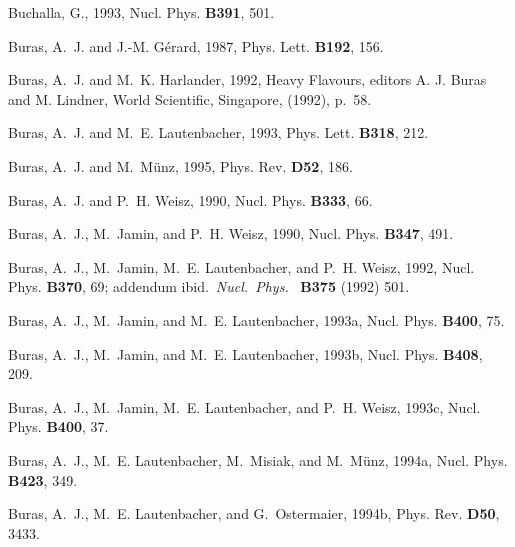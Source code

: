 \begin{thebibliography}{\protect{}1991}
Buchalla, G., 1993,
\newblock Nucl. Phys. {\bf B391}, 501.

Buras, A.~J. and J.-M. G\'{e}rard, 1987,
\newblock Phys. Lett. {\bf B192}, 156.

Buras, A.~J. and M.~K. Harlander, 1992,
 Heavy Flavours, {\rm editors A. J. Buras and M. Lindner,
  World Scientific, Singapore, (1992), p.\ 58}.

Buras, A.~J. and M.~E. Lautenbacher, 1993,
\newblock Phys. Lett. {\bf B318}, 212.

Buras, A.~J. and M.~M{\"u}nz, 1995,
\newblock Phys. Rev. {\bf D52}, 186.

Buras, A.~J. and P.~H. Weisz, 1990,
\newblock Nucl. Phys. {\bf B333}, 66.

Buras, A.~J., M.~Jamin, and P.~H. Weisz, 1990,
\newblock Nucl. Phys. {\bf B347}, 491.

Buras, A.~J., M.~Jamin, M.~E. Lautenbacher, and P.~H. Weisz, 1992,
\newblock Nucl. Phys. {\bf B370}, 69; addendum ibid.~{\em Nucl.~Phys.}~{\bf
  B375} (1992) 501.

Buras, A.~J., M.~Jamin, and M.~E. Lautenbacher, 1993a,
\newblock Nucl. Phys. {\bf B400}, 75.

Buras, A.~J., M.~Jamin, and M.~E. Lautenbacher, 1993b,
\newblock Nucl. Phys. {\bf B408}, 209.

Buras, A.~J., M.~Jamin, M.~E. Lautenbacher, and P.~H. Weisz, 1993c,
\newblock Nucl. Phys. {\bf B400}, 37.

Buras, A.~J., M.~E. Lautenbacher, M.~Misiak, and M.~M{\"u}nz, 1994a,
\newblock Nucl. Phys. {\bf B423}, 349.

Buras, A.~J., M.~E. Lautenbacher, and G.~Ostermaier, 1994b,
\newblock Phys. Rev. {\bf D50}, 3433.


\end{thebibliography}
